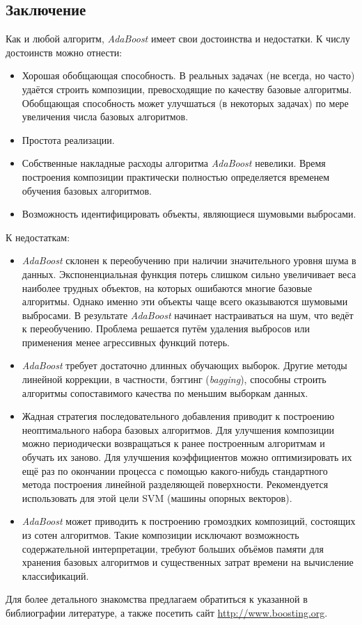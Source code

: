 \subsection{Заключение}

Как и любой алгоритм, \emph{AdaBoost} имеет свои достоинства и недостатки. К числу достоинств можно отнести:
\begin{itemize}
  \item Хорошая обобщающая способность. В реальных задачах (не всегда, но часто) удаётся строить композиции, превосходящие по качеству базовые алгоритмы. Обобщающая способность может улучшаться (в некоторых задачах) по мере увеличения числа базовых алгоритмов.
  \item Простота реализации.
  \item Собственные накладные расходы алгоритма \emph{AdaBoost} невелики. Время построения композиции практически полностью определяется временем обучения базовых алгоритмов.
  \item Возможность идентифицировать объекты, являющиеся шумовыми выбросами.
\end{itemize}

К недостаткам:
\begin{itemize}
  \item \emph{AdaBoost} склонен к переобучению при наличии значительного уровня шума в данных. Экспоненциальная функция потерь слишком сильно увеличивает веса наиболее трудных объектов, на которых ошибаются многие базовые алгоритмы. Однако именно эти объекты чаще всего оказываются шумовыми выбросами. В результате \emph{AdaBoost} начинает настраиваться на шум, что ведёт к переобучению. Проблема решается путём удаления выбросов или применения менее агрессивных функций потерь.
  \item \emph{AdaBoost} требует достаточно длинных обучающих выборок. Другие методы линейной коррекции, в частности, бэггинг (\emph{bagging}), способны строить алгоритмы сопоставимого качества по меньшим выборкам данных.
  \item Жадная стратегия последовательного добавления приводит к построению неоптимального набора базовых алгоритмов. Для улучшения композиции можно периодически возвращаться к ранее построенным алгоритмам и обучать их заново. Для улучшения коэффициентов можно оптимизировать их ещё раз по окончании процесса с помощью какого-нибудь стандартного метода построения линейной разделяющей поверхности. Рекомендуется использовать для этой цели SVM (машины опорных векторов).
  \item \emph{AdaBoost} может приводить к построению громоздких композиций, состоящих из сотен алгоритмов. Такие композиции исключают возможность содержательной интерпретации, требуют больших объёмов памяти для хранения базовых алгоритмов и существенных затрат времени на вычисление классификаций.
\end{itemize}

Для более детального знакомства предлагаем обратиться к указанной в библиографии литературе, а также посетить сайт \url{http://www.boosting.org}.

\newpage
